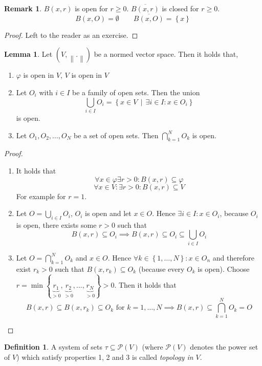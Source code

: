 \documentclass[a4paper,landscape,twocolumn]{article}
\theoremstyle{definition}
\newtheorem{defi}{Definition}
\newtheorem{rem}{Remark}
\newtheorem{lemma}{Lemma}
\newcommand\set[1]{\left\{#1\right\}}
\newcommand\setdef[2]{\left\{#1\,\middle|\,#2\right\}}
\newcommand\norm[1]{\left\|#1\right\|}
\begin{document}
\begin{rem}
  $B(x,r)$ is open for $r \geq 0$. $\overline{B(x,r)}$ is closed for $r \geq 0$.
  \[ B(x,O) = \emptyset \qquad \overline{B(x,O)} = \set{x} \]
\end{rem}
\begin{proof}
  Left to the reader as an exercise.
\end{proof}

\begin{lemma}
  Let $(V, \norm{.})$ be a normed vector space.
  Then it holds that,
  \begin{enumerate}
  \item $\varphi$ is open in $V$, $V$ is open in $V$
  \item Let $O_i$ with $i \in I$ be a family of open sets. Then the union
    \[ \bigcup_{i \in I} O_i = \setdef{x \in V}{\exists i \in I: x \in O_i} \]
    is open.
  \item Let $O_1, O_2, \ldots, O_N$ be a set of open sets.
    Then $\bigcap_{k=1}^N O_k$ is open.
  \end{enumerate}
\end{lemma}
\begin{proof}
  \begin{enumerate}
  \item It holds that
    \[ \forall x \in \varphi \exists r > 0: B(x,r) \subseteq \varphi \]
    \[ \forall x \in V: \exists r > 0: B(x, r) \subseteq V \]
    For example for $r=1$.
  \item Let $O = \bigcup_{i \in I} O_i$, $O_i$ is open and let $x \in O$.
    Hence $\exists i \in I: x \in O_i$, because $O_i$ is open, there exists
    some $r > 0$ such that
    \[ B(x,r) \subseteq O_i \implies B(x,r) \subseteq O_i \subseteq \bigcup_{i \in I} O_i \]
  \item
    Let $O = \bigcap_{k=1}^N O_k$ and $x \in O$.
    Hence $\forall k \in \set{1, \ldots, N}: x \in O_n$ and therefore exist $r_k > 0$
    such that $B(x, r_k) \subseteq O_k$ (because every $O_k$ is open).
    Choose $r = \min\set{\underbrace{r_1}_{>0}, \underbrace{r_2}_{>0}, \ldots, \underbrace{r_N}_{>0}} > 0$.
    Then it holds that
    \[ B(x, r) \subseteq B(x,r_k) \subseteq O_k \text{ for } k = 1, \ldots, N \implies B(x,r) \subseteq \bigcap_{k=1}^N O_k = O \]
  \end{enumerate}
\end{proof}

\begin{defi}
  A system of sets $\tau \subseteq \mathcal P(V)$ (where $\mathcal P(V)$ denotes the power set of $V$)
  which satisfy properties 1, 2 and 3 is called \emph{topology in $V$}.
\end{defi}
\end{document}
